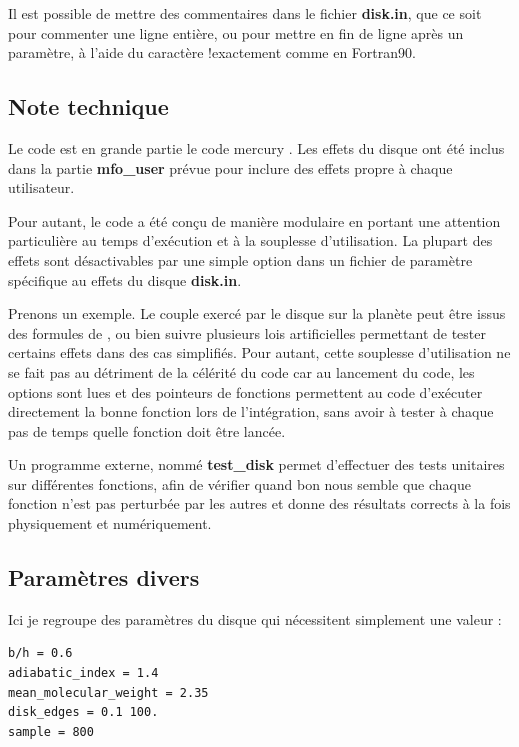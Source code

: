 \begin{remarque}
Il est possible de mettre des commentaires dans le fichier \textbf{disk.in}, que ce soit pour commenter une ligne entière, ou pour mettre en fin de ligne après un paramètre, à l'aide du caractère \og !\fg exactement comme en Fortran90.
\end{remarque}

\subsection{Note technique}
Le code est en grande partie le code mercury \cite{chambers1999hybrid}. Les effets du disque ont été inclus dans la partie \textbf{mfo\_user} prévue pour inclure des effets propre à chaque utilisateur. 

Pour autant, le code a été conçu de manière modulaire en portant une attention particulière au temps d'exécution et à la souplesse d'utilisation. La plupart des effets sont désactivables par une simple option dans un fichier de paramètre spécifique au effets du disque \textbf{disk.in}. 

Prenons un exemple. Le couple exercé par le disque sur la planète peut être issus des formules de \cite{paardekooper2011torque}, ou bien suivre plusieurs lois artificielles permettant de tester certains effets dans des cas simplifiés. Pour autant, cette souplesse d'utilisation ne se fait pas au détriment de la célérité du code car au lancement du code, les options sont lues et des pointeurs de fonctions permettent au code d'exécuter directement la bonne fonction lors de l'intégration, sans avoir à tester à chaque pas de temps quelle fonction doit être lancée. 

\bigskip

Un programme externe, nommé \textbf{test\_disk} permet d'effectuer des tests unitaires sur différentes fonctions, afin de vérifier quand bon nous semble que chaque fonction n'est pas perturbée par les autres et donne des résultats corrects à la fois physiquement et numériquement.

\subsection{Paramètres divers}
Ici je regroupe des paramètres du disque qui nécessitent simplement une valeur : 
\begin{verbatim}
b/h = 0.6
adiabatic_index = 1.4
mean_molecular_weight = 2.35
disk_edges = 0.1 100.
sample = 800
\end{verbatim}

